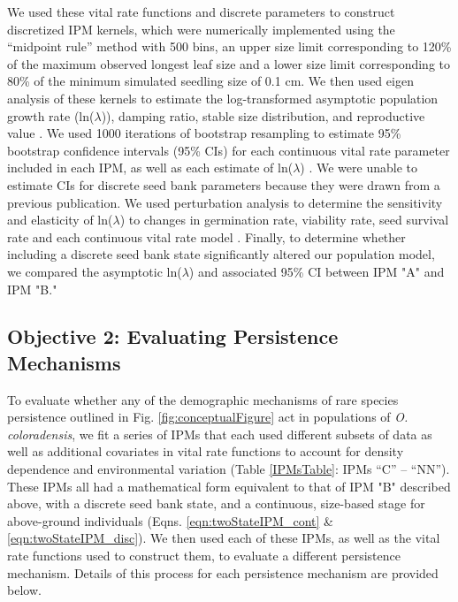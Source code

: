 \documentclass[12pt, letterpaper]{article}
\begin{document}
We used these vital rate functions and discrete parameters to construct discretized IPM kernels, which were numerically implemented using the “midpoint rule” method \cite{Easterling2000} with 500 bins, an upper size limit corresponding to 120\% of the maximum observed longest leaf size and a lower size limit corresponding to 80\% of the minimum simulated seedling size of 0.1 cm. We then used eigen analysis of these kernels to estimate the log-transformed asymptotic population growth rate (ln($\lambda$)), damping ratio, stable size distribution, and reproductive value \cite{Caswell2001MatrixInterpretation, Ellner2016Data-drivenPopulations}. We used 1000 iterations of bootstrap resampling to estimate 95\% bootstrap confidence intervals (95\% CIs) for each continuous vital rate parameter included in each IPM, as well as each estimate of ln($\lambda$) \cite{Merow2014AdvancingGuide, Fieberg2020Resampling-basedBiologists}. We were unable to estimate CIs for discrete seed bank parameters because they were drawn from a previous publication. We used perturbation analysis to determine the sensitivity and elasticity of ln($\lambda$) to changes in germination rate, viability rate, seed survival rate and each continuous vital rate model \cite{Morris2002QuantitativeAnalysis}. Finally, to determine whether including a discrete seed bank state significantly altered our population model, we compared the asymptotic ln($\lambda$) and associated 95\% CI between IPM "A" and IPM "B." 

\subsection{Objective 2: Evaluating Persistence Mechanisms}
To evaluate whether any of the demographic mechanisms of rare species persistence outlined in Fig. \ref{fig:conceptualFigure} act in populations of \textit{O. coloradensis}, we fit a series of IPMs that each used different subsets of data as well as additional covariates in vital rate functions to account for density dependence and environmental variation (Table \ref{IPMsTable}: IPMs “C” – “NN”). These IPMs all had a mathematical form equivalent to that of IPM "B" described above, with a discrete seed bank state, and a continuous, size-based stage for above-ground individuals (Eqns. \ref{eqn:twoStateIPM_cont} \& \ref{eqn:twoStateIPM_disc}). We then used each of these IPMs, as well as the vital rate functions used to construct them, to evaluate a different persistence mechanism. Details of this process for each persistence mechanism are provided below. 
\end{document}

